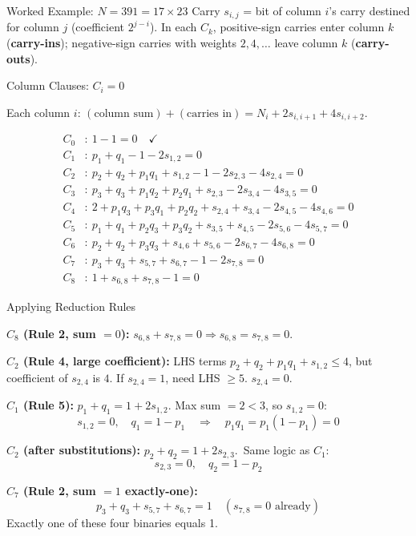 \documentclass[9pt]{beamer}
\begin{document}
\begin{frame}{Worked Example: $N = 391 = 17 \times 23$}
Carry $s_{i,j}$ = bit of column $i$'s carry destined for column $j$ (coefficient $2^{j-i}$). In each $C_k$, positive-sign carries enter column $k$ (\textbf{carry-ins}); negative-sign carries with weights $2,4,\dots$ leave column $k$ (\textbf{carry-outs}).
\end{frame}

\begin{frame}{Column Clauses: $C_i = 0$}

\small
Each column $i$: $(\text{column sum}) + (\text{carries in}) = N_i + 2 s_{i,i+1} + 4 s_{i,i+2}$.

\medskip
\begin{align*}
C_0 &:\ 1 - 1 = 0 \quad \checkmark\\
C_1 &:\ p_1 + q_1 - 1 - 2 s_{1,2} = 0 \\
C_2 &:\ p_2 + q_2 + p_1 q_1 + s_{1,2} - 1 - 2 s_{2,3} - 4 s_{2,4} = 0 \\
C_3 &:\ p_3 + q_3 + p_1 q_2 + p_2 q_1 + s_{2,3} - 2 s_{3,4} - 4 s_{3,5} = 0 \\
C_4 &:\ 2 + p_1 q_3 + p_3 q_1 + p_2 q_2 + s_{2,4} + s_{3,4} - 2 s_{4,5} - 4 s_{4,6} = 0 \\
C_5 &:\ p_1 + q_1 + p_2 q_3 + p_3 q_2 + s_{3,5} + s_{4,5} - 2 s_{5,6} - 4 s_{5,7} = 0 \\
C_6 &:\ p_2 + q_2 + p_3 q_3 + s_{4,6} + s_{5,6} - 2 s_{6,7} - 4 s_{6,8} = 0 \\
C_7 &:\ p_3 + q_3 + s_{5,7} + s_{6,7} - 1 - 2 s_{7,8} = 0 \\
C_8 &:\ 1 + s_{6,8} + s_{7,8} - 1 = 0
\end{align*}
\end{frame}

\begin{frame}{Applying Reduction Rules}
\small

\textbf{$C_8$ (Rule 2, sum $= 0$):} $s_{6,8} + s_{7,8} = 0 \Rightarrow \boxed{s_{6,8} = s_{7,8} = 0}$.

\medskip
\textbf{$C_2$ (Rule 4, large coefficient):} LHS terms $p_2{+}q_2{+}p_1q_1{+}s_{1,2} \le 4$, but coefficient of $s_{2,4}$ is $4$. If $s_{2,4}{=}1$, need LHS $\ge 5$. \quad $\boxed{s_{2,4} = 0}$.

\medskip
\textbf{$C_1$ (Rule 5):} $p_1 + q_1 = 1 + 2 s_{1,2}$. Max sum $= 2 < 3$, so $s_{1,2} = 0$:
\[
\boxed{s_{1,2} = 0,\quad q_1 = 1 - p_1} \quad\Rightarrow\quad p_1 q_1 = p_1(1-p_1) = 0
\]

\medskip
\textbf{$C_2$ (after substitutions):} $p_2 + q_2 = 1 + 2 s_{2,3}$.\ Same logic as $C_1$:
\[
\boxed{s_{2,3} = 0,\quad q_2 = 1 - p_2}
\]

\medskip
\textbf{$C_7$ (Rule 2, sum $= 1$ exactly-one):}
\[
p_3 + q_3 + s_{5,7} + s_{6,7} = 1 \quad (s_{7,8}=0 \text{ already})
\]
Exactly one of these four binaries equals 1.
\end{frame}
\end{document}
